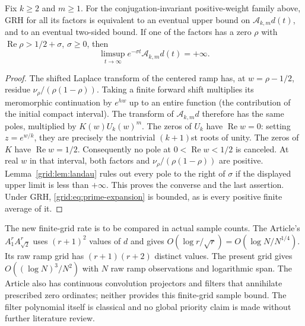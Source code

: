 \begin{theorem}
Fix $k\ge2$ and $m\ge1$. For the conjugation-invariant positive-weight
family above, GRH for all its factors is equivalent to an eventual upper
bound on $\mathcal A_{k,m}d(t)$, and to an eventual two-sided bound.
If one of the factors has a zero $\rho$ with
$\operatorname{Re}\rho>1/2+\sigma$, $\sigma\ge0$, then
\[
 \limsup_{t\to\infty}e^{-\sigma t}\mathcal A_{k,m}d(t)=+\infty.
\]
\end{theorem}
\begin{proof}
The shifted Laplace transform of the centered ramp has, at
$w=\rho-1/2$, residue $\nu_\rho/(\rho(1-\rho))$. Taking a finite forward
shift multiplies its meromorphic continuation by $e^{hw}$ up to an entire
function (the contribution of the initial compact interval). The transform
of $\mathcal A_{k,m}d$ therefore has the same poles, multiplied by
$K(w)U_k(w)^m$. The zeros of $U_k$ have $\operatorname{Re}w=0$:
setting $z=e^{w/k}$, they are precisely the nontrivial $(k+1)$st roots of
unity. The zeros of $K$ have $\operatorname{Re}w=1/2$.
Consequently no pole at $0<\operatorname{Re}w<1/2$ is canceled. At real
$w$ in that interval, both factors and $\nu_\rho/(\rho(1-\rho))$
are positive. Lemma~\ref{grid:lem:landau} rules out every pole
to the right of $\sigma$ if the displayed upper limit is less than $+\infty$. This
proves the converse and the last assertion. Under GRH,
\eqref{grid:eq:prime-expansion} is bounded, as is every positive finite
average of it.
\end{proof}

The new finite-grid rate is to be compared in actual sample counts. The
Article's $A_1^rA_{\sqrt2}^r$ uses $(r+1)^2$ values of $d$ and gives
$O(\log r/\sqrt r)=O(\log N/N^{1/4})$. Its raw ramp grid has
$(r+1)(r+2)$ distinct values. The present grid gives
$O((\log N)^3/N^2)$ with $N$ raw ramp observations and logarithmic span.
The Article also has continuous convolution projectors and filters that
annihilate prescribed zero ordinates; neither provides this finite-grid
sample bound. The filter polynomial itself is classical and no global
priority claim is made without further literature review.
